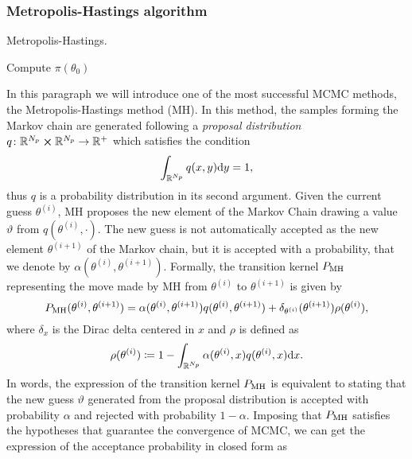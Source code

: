 \subsubsection{Metropolis-Hastings algorithm}
\begin{algorithm}[t]
	\caption{Metropolis-Hastings.}
	\label{alg:MH}
	Compute $\pi(\theta_0)$ \;
\end{algorithm}
In this paragraph we will introduce one of the most successful MCMC methods, the Metropolis-Hastings method (MH). In this method, the samples forming the Markov chain are generated following a \textit{proposal distribution} $q\colon \mathbb{R}^{N_p} \cross \mathbb{R}^{N_p} \to \mathbb{R}^+$ which satisfies the condition
\begin{equation}
	\int_{\mathbb{R}^{N_p}}q(x, y)\dd y = 1,
\end{equation}
thus $q$ is a probability distribution in its second argument. Given the current guess $\theta^{(i)}$, MH proposes the new element of the Markov Chain drawing a value $\vartheta$ from $q(\theta^{(i)}, \cdot)$. The new guess is not automatically accepted as the new element $\theta^{(i+1)}$ of the Markov chain, but it is accepted with a probability, that we denote by $\alpha(\theta^{(i)}, \theta^{(i+1)})$. Formally, the transition kernel $P_{\mathrm{MH}}$ representing the move made by MH from $\theta^{(i)}$ to $\theta^{(i+1)}$ is given by \cite{MLR16}
\begin{equation}
	P_{\mathrm{MH}}(\theta^{(i)}, \theta^{(i+1)}) = \alpha(\theta^{(i)}, \theta^{(i+1)})q(\theta^{(i)},\theta^{(i+1)}) + \delta_{\theta^{(i)}}(\theta^{(i+1)})\rho(\theta^{(i)}),
\end{equation}
where $\delta_x$ is the Dirac delta centered in $x$ and $\rho$ is defined as
\begin{equation}
	\rho(\theta^{(i)}) \coloneqq 1 - \int_{\mathbb{R}^{N_p}}\alpha(\theta^{(i)}, x)q(\theta^{(i)}, x)\dd x.
\end{equation}
In words, the expression of the transition kernel $P_{\mathrm{MH}}$ is equivalent to stating that the new guess $\vartheta$ generated from the proposal distribution is accepted with probability $\alpha$ and rejected with probability $1 - \alpha$. Imposing that $P_{\mathrm{MH}}$ satisfies the hypotheses that guarantee the convergence of MCMC, we can get the expression of the acceptance probability in closed form as 

